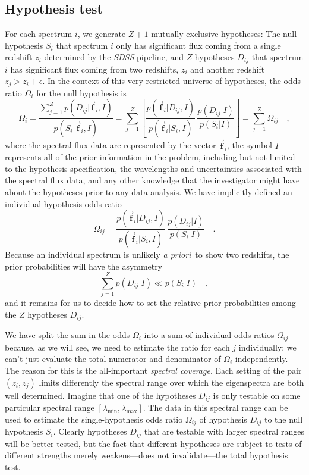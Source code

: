 \documentclass[12pt]{article}
\newcommand{\facility}[1]{\textsl{#1}}
\newcommand{\foreign}[1]{\textsl{#1}}
\newcommand{\apriori}{\foreign{a priori}}
\newcommand{\hoggvector}[1]{\boldsymbol{\vec{#1}}}
\newcommand{\fvec}{\hoggvector{f}}
\begin{document}
\subsection{Hypothesis test}

For each spectrum $i$, we generate $Z+1$ mutually exclusive hypotheses:
The null hypothesis $S_i$ that spectrum $i$ only has significant flux
coming from a single redshift $z_i$ determined by the \facility{SDSS}
pipeline, and $Z$ hypotheses $D_{ij}$ that spectrum $i$ has significant
flux coming from two redshifts, $z_i$ and another redshift
$z_j>z_i+\epsilon$.  In the context of this very restricted universe
of hypotheses, the odds ratio $\Omega_i$ for the null hypothesis is
\begin{equation}\label{eq:odds}
\Omega_i = \frac{\sum_{j=1}^Z p(D_{ij}|\fvec_i,I)}{p(S_i|\fvec_i,I)}
 = \sum_{j=1}^Z \left[\frac{p(\fvec_i|D_{ij},I)}{p(\fvec_i|S_i,I)}
 \,\frac{p(D_{ij}|I)}{p(S_i|I)}\right] = \sum_{j=1}^Z\Omega_{ij}\quad,
\end{equation}
where the spectral flux data are represented by the vector
$\fvec_i$, the symbol $I$ represents all of the prior information
in the problem, including but not limited to the hypothesis
specification, the wavelengths and uncertainties associated with the
spectral flux data, and any other knowledge that the investigator
might have about the hypotheses prior to any data analysis.  We have
implicitly defined an individual-hypothesis odds ratio
\begin{equation}
\Omega_{ij} = \frac{p(\fvec_i|D_{ij},I)}{p(\fvec_i|S_i,I)}
  \,\frac{p(D_{ij}|I)}{p(S_i|I)}\quad.
\end{equation}
Because an individual spectrum is unlikely \apriori\ to show two
redshifts, the prior probabilities will have the asymmetry
\begin{equation}
\sum_{j=1}^Z p(D_{ij}|I) \ll p(S_i|I) \quad,
\end{equation}
and it remains for us to decide how to set the relative prior
probabilities among the $Z$ hypotheses $D_{ij}$.

We have split the sum in the odds $\Omega_i$ into a sum of individual
odds ratios $\Omega_{ij}$ because, as we will see, we need to estimate
the ratio for each $j$ individually; we can't just evaluate the total
numerator and denominator of $\Omega_i$ independently.  The reason for
this is the all-important \emph{spectral coverage}.  Each setting of
the pair $(z_i,z_j)$ limits differently the spectral range over which
the eigenspectra are both well determined.  Imagine that one of the
hypotheses $D_{ij}$ is only testable on some particular spectral range
$[\lambda_{\min},\lambda_{\max}]$.  The data in this spectral range
can be used to estimate the single-hypothesis odds ratio $\Omega_{ij}$
of hypothesis $D_{ij}$ to the null hypothesis $S_i$.  Clearly
hypotheses $D_{ij}$ that are testable with larger spectral ranges will
be better tested, but the fact that different hypotheses are subject
to tests of different strengths merely weakens---does not
invalidate---the total hypothesis test.
\end{document}
